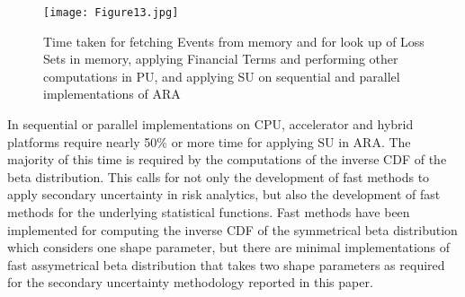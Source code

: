 \begin{figure*}
	\centering
	\texttt{[image: Figure13.jpg]}
	\caption{Time taken for fetching Events from memory and for look up of Loss Sets in memory, applying Financial Terms and performing other computations in PU, and applying SU on sequential and parallel implementations of ARA}
	\label{figure13}
\end{figure*}

In sequential or parallel implementations on CPU, accelerator and hybrid platforms require nearly 50\% or more time for applying SU in ARA. The majority of this time is required by the computations of the inverse CDF of the beta distribution. This calls for not only the development of fast methods to apply secondary uncertainty in risk analytics, but also the development of fast methods for the underlying statistical functions. Fast methods have been implemented for computing the inverse CDF of the symmetrical beta distribution \cite{invsymbetadist} which considers one shape parameter, but there are minimal implementations of fast assymetrical beta distribution that takes two shape parameters as required for the secondary uncertainty methodology reported in this paper.
